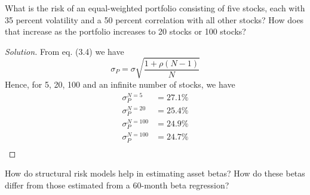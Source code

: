 \begin{problem}{3.3}
 What is the risk of an equal-weighted portfolio consisting of five stocks, each with 35 percent volatility and a 50 percent correlation with all other stocks? How does that increase as the portfolio increases to 20 stocks or 100 stocks?
\end{problem}

\begin{proof}[Solution]
 From eq. (3.4) we have
 \begin{equation*}
  \sigma_{P}=\sigma\sqrt{\frac{1+\rho(N-1)}{N}}
 \end{equation*}
 Hence, for 5, 20, 100 and an infinite number of stocks, we have
 \begin{align*}
  \sigma_{P}^{N=5}&=27.1\%\\
  \sigma_{P}^{N=20}&=25.4\%\\
  \sigma_{P}^{N=100}&=24.9\%\\
  \sigma_{P}^{N=100}&=24.7\%\\
 \end{align*}
\end{proof}

\begin{problem}{3.4}
 How do structural risk models help in estimating asset betas? How do these betas differ from those estimated from a 60-month beta regression?
\end{problem}

